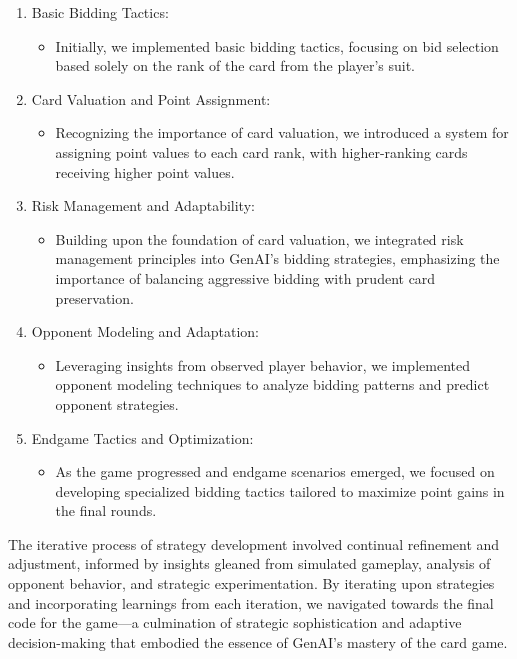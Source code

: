 \documentclass[
]{article}
\providecommand{\tightlist}{%
  \setlength{\itemsep}{0pt}\setlength{\parskip}{0pt}}
\begin{document}
\begin{enumerate}
\def\labelenumi{\arabic{enumi}.}
\tightlist
\item
  Basic Bidding Tactics:

  \begin{itemize}
  \tightlist
  \item
    Initially, we implemented basic bidding tactics, focusing on bid
    selection based solely on the rank of the card from the player's
    suit.
  \end{itemize}
\item
  Card Valuation and Point Assignment:

  \begin{itemize}
  \tightlist
  \item
    Recognizing the importance of card valuation, we introduced a system
    for assigning point values to each card rank, with higher-ranking
    cards receiving higher point values.
  \end{itemize}
\item
  Risk Management and Adaptability:

  \begin{itemize}
  \tightlist
  \item
    Building upon the foundation of card valuation, we integrated risk
    management principles into GenAI's bidding strategies, emphasizing
    the importance of balancing aggressive bidding with prudent card
    preservation.
  \end{itemize}
\item
  Opponent Modeling and Adaptation:

  \begin{itemize}
  \tightlist
  \item
    Leveraging insights from observed player behavior, we implemented
    opponent modeling techniques to analyze bidding patterns and predict
    opponent strategies.
  \end{itemize}
\item
  Endgame Tactics and Optimization:

  \begin{itemize}
  \tightlist
  \item
    As the game progressed and endgame scenarios emerged, we focused on
    developing specialized bidding tactics tailored to maximize point
    gains in the final rounds.
  \end{itemize}
\end{enumerate}

The iterative process of strategy development involved continual
refinement and adjustment, informed by insights gleaned from simulated
gameplay, analysis of opponent behavior, and strategic experimentation.
By iterating upon strategies and incorporating learnings from each
iteration, we navigated towards the final code for the game---a
culmination of strategic sophistication and adaptive decision-making
that embodied the essence of GenAI's mastery of the card game.
\end{document}
